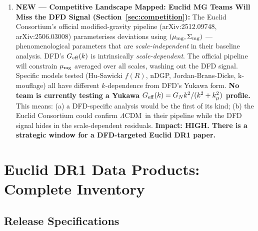 \documentclass[11pt,a4paper]{article}
\newcommand{\LCDM}{$\Lambda$CDM}
\newcommand{\kmu}{k_\mu}
\newcommand{\Geff}{G_{\rm eff}}
\begin{document}
\begin{findbox}
\begin{enumerate}
\item \textbf{NEW --- Competitive Landscape Mapped: Euclid MG Teams Will
  Miss the DFD Signal (Section~\ref{sec:competition}):}
  The Euclid Consortium's official modified-gravity pipeline
  (arXiv:2512.09748, arXiv:2506.03008) parameterises deviations using
  $(\mu_{\rm mg}, \Sigma_{\rm mg})$ --- phenomenological parameters that
  are \emph{scale-independent} in their baseline analysis. DFD's
  $\Geff(k)$ is intrinsically \emph{scale-dependent}. The official
  pipeline will constrain $\mu_{\rm mg}$ averaged over all scales,
  washing out the DFD signal. Specific models tested (Hu-Sawicki $f(R)$,
  nDGP, Jordan-Brans-Dicke, k-mouflage) all have different $k$-dependence
  from DFD's Yukawa form. \textbf{No team is currently testing a Yukawa
  $\Geff(k) = G_N k^2/(k^2 + \kmu^2)$ profile.} This means:
  (a) a DFD-specific analysis would be the first of its kind;
  (b) the Euclid Consortium could confirm \LCDM\ in their pipeline
  while the DFD signal hides in the scale-dependent residuals.
  \textbf{Impact: HIGH. There is a strategic window for a
  DFD-targeted Euclid DR1 paper.}

\end{enumerate}
\end{findbox}


\section{Euclid DR1 Data Products: Complete Inventory}
\label{sec:inventory}

\subsection{Release Specifications}
\end{document}
